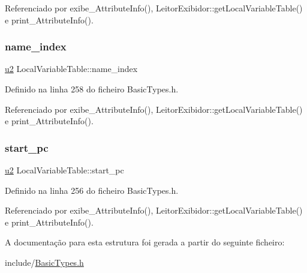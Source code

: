 Referenciado por exibe\+\_\+\+Attribute\+Info(), Leitor\+Exibidor\+::get\+Local\+Variable\+Table() e print\+\_\+\+Attribute\+Info().

\mbox{\label{structLocalVariableTable_ac533f255b730a2442710dd5568cdb151}} 
\subsubsection{\texorpdfstring{name\+\_\+index}{name\_index}}
{\footnotesize\ttfamily \hyperlink{BasicTypes_8h_a732cde1300aafb73b0ea6c2558a7a54f}{u2} Local\+Variable\+Table\+::name\+\_\+index}



Definido na linha 258 do ficheiro Basic\+Types.\+h.



Referenciado por exibe\+\_\+\+Attribute\+Info(), Leitor\+Exibidor\+::get\+Local\+Variable\+Table() e print\+\_\+\+Attribute\+Info().

\mbox{\label{structLocalVariableTable_a59c9262cde04e95d5600bab33ffa969e}} 
\subsubsection{\texorpdfstring{start\+\_\+pc}{start\_pc}}
{\footnotesize\ttfamily \hyperlink{BasicTypes_8h_a732cde1300aafb73b0ea6c2558a7a54f}{u2} Local\+Variable\+Table\+::start\+\_\+pc}



Definido na linha 256 do ficheiro Basic\+Types.\+h.



Referenciado por exibe\+\_\+\+Attribute\+Info(), Leitor\+Exibidor\+::get\+Local\+Variable\+Table() e print\+\_\+\+Attribute\+Info().



A documentação para esta estrutura foi gerada a partir do seguinte ficheiro\+:\begin{DoxyCompactItemize}
\item 
include/\hyperlink{BasicTypes_8h}{Basic\+Types.\+h}\end{DoxyCompactItemize}
